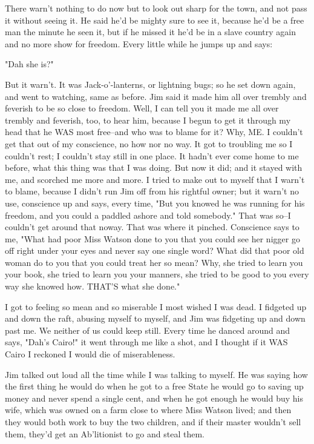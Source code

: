 There warn't nothing to do now but to look out sharp for the town, and
not pass it without seeing it.  He said he'd be mighty sure to see it,
because he'd be a free man the minute he seen it, but if he missed it
he'd be in a slave country again and no more show for freedom.  Every
little while he jumps up and says:

"Dah she is?"

But it warn't.  It was Jack-o'-lanterns, or lightning bugs; so he set
down again, and went to watching, same as before.  Jim said it made him
all over trembly and feverish to be so close to freedom.  Well, I can
tell you it made me all over trembly and feverish, too, to hear him,
because I begun to get it through my head that he WAS most free--and who
was to blame for it?  Why, ME.  I couldn't get that out of my conscience,
no how nor no way. It got to troubling me so I couldn't rest; I couldn't
stay still in one place.  It hadn't ever come home to me before, what
this thing was that I was doing.  But now it did; and it stayed with me,
and scorched me more and more.  I tried to make out to myself that I
warn't to blame, because I didn't run Jim off from his rightful owner;
but it warn't no use, conscience up and says, every time, "But you knowed
he was running for his freedom, and you could a paddled ashore and told
somebody."  That was so--I couldn't get around that noway.  That was
where it pinched.  Conscience says to me, "What had poor Miss Watson done
to you that you could see her nigger go off right under your eyes and
never say one single word?  What did that poor old woman do to you that
you could treat her so mean?  Why, she tried to learn you your book, she
tried to learn you your manners, she tried to be good to you every way
she knowed how.  THAT'S what she done."

I got to feeling so mean and so miserable I most wished I was dead.  I
fidgeted up and down the raft, abusing myself to myself, and Jim was
fidgeting up and down past me.  We neither of us could keep still.  Every
time he danced around and says, "Dah's Cairo!" it went through me like a
shot, and I thought if it WAS Cairo I reckoned I would die of
miserableness.

Jim talked out loud all the time while I was talking to myself.  He was
saying how the first thing he would do when he got to a free State he
would go to saving up money and never spend a single cent, and when he
got enough he would buy his wife, which was owned on a farm close to
where Miss Watson lived; and then they would both work to buy the two
children, and if their master wouldn't sell them, they'd get an
Ab'litionist to go and steal them.

